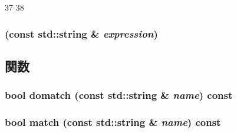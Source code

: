 \begin{DoxyCode}
37 {
38 }
\end{DoxyCode}
\hypertarget{classObjectMatch_a977996eb7a7dc9774a38bdce741bef81}{
\subsubsection[{ObjectMatch}]{ (const std::string \& {\em expression})}}
\label{classObjectMatch_a977996eb7a7dc9774a38bdce741bef81}


\subsection{関数}
\hypertarget{classObjectMatch_a2f08a2a1bf9342fab98ef5e12dd0d685}{
\subsubsection[{domatch}]{\setlength{\rightskip}{0pt plus 5cm}bool domatch (const std::string \& {\em name}) const}}
\label{classObjectMatch_a2f08a2a1bf9342fab98ef5e12dd0d685}
\hypertarget{classObjectMatch_a4bf7f57ee970d2d7331d4ac65710bb66}{
\subsubsection[{match}]{\setlength{\rightskip}{0pt plus 5cm}bool match (const std::string \& {\em name}) const}}
\label{classObjectMatch_a4bf7f57ee970d2d7331d4ac65710bb66}



